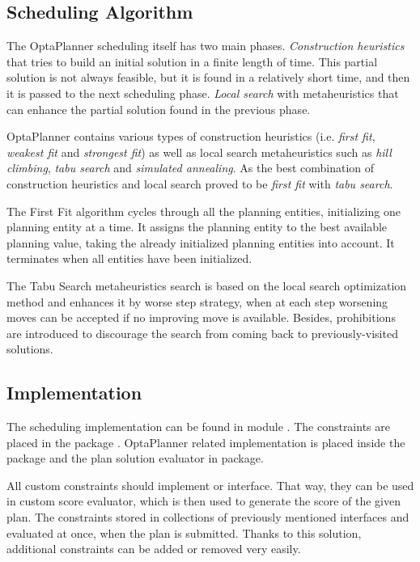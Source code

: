 \subsection{Scheduling Algorithm}
The OptaPlanner scheduling itself has two main phases.
\textit{Construction heuristics} that tries to build an initial solution in a finite length of time.
This partial solution is not always feasible, 
but it is found in a relatively short time, and then it is passed to the next scheduling phase.
\textit{Local search} with metaheuristics that can enhance the partial solution found in the previous phase.

OptaPlanner contains various types of construction heuristics (i.e. \textit{first fit}, \textit{weakest fit} and \textit{strongest fit})
as well as local search metaheuristics such as \textit{hill climbing}, \textit{tabu search} and \textit{simulated annealing}.
As the best combination of construction heuristics and local search proved to be \textit{first fit} with \textit{tabu search}.

The First Fit algorithm cycles through all the planning entities,
initializing one planning entity at a time. 
It assigns the planning entity to the best available planning value, 
taking the already initialized planning entities into account.
It terminates when all entities have been initialized\cite{optaplannerDoc:heuristics}.

The Tabu Search metaheuristics search is based on the local search optimization method
and enhances it by worse step strategy, 
when at each step worsening moves can be accepted if no improving move is available.
Besides, prohibitions are introduced to discourage the search from coming back to previously-visited solutions\cite{glover1989tabu}.

\subsection{Implementation}
The scheduling implementation can be found in module .
The constraints are placed in the package .
OptaPlanner related implementation is placed inside the  package
and the plan solution evaluator in  package.

All custom constraints should implement  
or  interface.
That way, 
they can be used in custom score evaluator,
which is then used to generate the score of the given plan.
The constraints stored in collections of previously mentioned interfaces 
and evaluated at once, when the plan is submitted.
Thanks to this solution,
additional constraints can be added or removed very easily.


